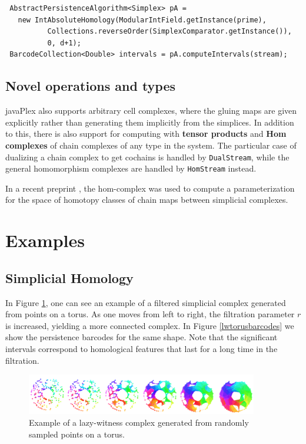 \begin{verbatim}
 AbstractPersistenceAlgorithm<Simplex> pA = 
   new IntAbsoluteHomology(ModularIntField.getInstance(prime), 
          Collections.reverseOrder(SimplexComparator.getInstance()), 
          0, d+1);
 BarcodeCollection<Double> intervals = pA.computeIntervals(stream);
\end{verbatim}

\subsection{Novel operations and types}
\label{sec:novel-oper-types}

javaPlex also supports arbitrary cell complexes, where the gluing maps
are given explicitly rather than generating them implicitly from the
simplices. In addition to this, there is also support for computing
with \textbf{tensor products} and \textbf{Hom complexes} of chain
complexes of any type in the system. The particular case of dualizing
a chain complex to get cochains is handled by \texttt{DualStream},
while the general homomorphism complexes are handled by
\texttt{HomStream} instead.

In a recent preprint \cite{hom}, the hom-complex was used to compute a parameterization for the space of homotopy classes of chain maps between simplicial complexes.


\section{Examples}

\subsection{Simplicial Homology}

In Figure \ref{lwtorus}, one can see an example of a filtered simplicial complex generated from points on a torus. As one moves from left to right, the filtration parameter $r$ is increased, yielding a more connected complex. In Figure \ref{lwtorusbarcodes} we show the persistence barcodes for the same shape. Note that the significant intervals correspond to homological features that last for a long time in the filtration.

\begin{figure}
\centering
\includegraphics[width=0.9\textwidth]{Adams_Henry/images/tori_small.png}
\caption{Example of a lazy-witness complex generated from randomly sampled points on a torus.} \label{lwtorus}
\end{figure}

